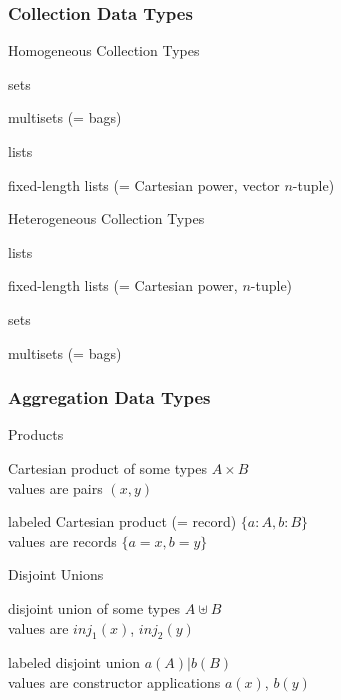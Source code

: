 \begin{frame}\frametitle{Collection Data Types}
\begin{blockitems}{Homogeneous Collection Types}
 \item sets
 \item multisets (= bags)
 \item lists
 \item fixed-length lists (= Cartesian power, vector $n$-tuple)
\end{blockitems}

\begin{blockitems}{Heterogeneous Collection Types}
 \item lists
 \item fixed-length lists (= Cartesian power, $n$-tuple)
 \item sets
 \item multisets (= bags)
\end{blockitems}
\end{frame}

\begin{frame}\frametitle{Aggregation Data Types}
\begin{blockitems}{Products}
 \item Cartesian product of some types $A\times B$ \\
 values are pairs $(x,y)$ 
 \item labeled Cartesian product (= record) $\{a: A, b: B\}$ \\
 values are records $\{a=x, b=y\}$
\end{blockitems}

\begin{blockitems}{Disjoint Unions}
 \item disjoint union of some types $A\uplus B$\\
  values are $inj_1(x)$, $inj_2(y)$
 \item labeled disjoint union $a(A)|b(B)$ \\
  values are constructor applications $a(x)$, $b(y)$
\end{blockitems}

\end{frame}

